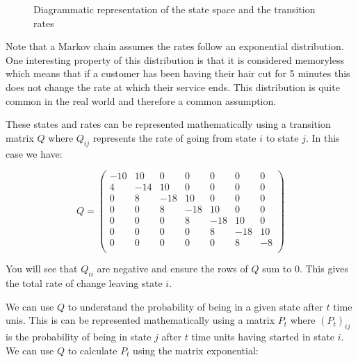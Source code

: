 \begin{figure}[!hbtp]
    \begin{center}
    
    \end{center}
    \caption{Diagrammatic representation of the state space and the transition
    rates}
    \label{fig:barber-shop-continuous-markov-process}
\end{figure}

Note that a Markov chain assumes the rates follow an exponential distribution.
One interesting property of this distribution is that it is considered
memoryless which means that if a customer has been having their hair cut for 5
minutes this does not change the rate at which their service ends.
This distribution is quite common in the real world and therefore a common
assumption.

These states and rates can be represented mathematically using a transition
matrix \(Q\) where \(Q_{ij}\) represents the rate of going from state \(i\) to
state \(j\). In this case we have:

\begin{equation}
Q =
\begin{pmatrix}
-10 &  10 &   0 &   0 &   0 &   0 &   0\\
  4 & -14 &  10 &   0 &   0 &   0 &   0\\
  0 &   8 & -18 &  10 &   0 &   0 &   0\\
  0 &   0 &   8 & -18 &  10 &   0 &   0\\
  0 &   0 &   0 &   8 & -18 &  10 &   0\\
  0 &   0 &   0 &   0 &   8 & -18 &  10\\
  0 &   0 &   0 &   0 &   0 &   8 &  -8\\
 \end{pmatrix}
 \label{eqn:barber_shop_transition_matrix}
\end{equation}

You will see that \(Q_{ii}\) are negative and ensure the rows of \(Q\) sum to 0.
This gives the total rate of change leaving state \(i\).

We can use \(Q\) to understand the probability of being in a given state after
\(t\) time unis. This is can be represented mathematically using a matrix
\(P_{t}\) where \((P_{t})_{ij}\) is the probability of being in state \(j\)
after \(t\) time units having started in state \(i\). We can use \(Q\) to
calculate \(P_{t}\) using the matrix exponential:

